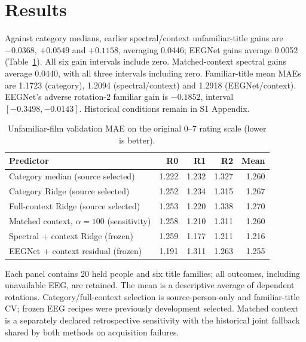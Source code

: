 \documentclass[10pt,letterpaper]{article}
\begin{document}
\section{Results}


Against category medians, earlier spectral/context unfamiliar-title gains are \(-0.0368\), \(+0.0549\) and \(+0.1158\), averaging 0.0446; EEGNet gains average 0.0052 (Table~\ref{tab:primary}). All six gain intervals include zero. Matched-context spectral gains average 0.0440, with all three intervals including zero. Familiar-title mean MAEs are 1.1723 (category), 1.2094 (spectral/context) and 1.2918 (EEGNet/context). EEGNet's adverse rotation-2 familiar gain is \(-0.1852\), interval \([-0.3498,-0.0143]\). Historical conditions remain in S1 Appendix.

\begin{table}[!htbp]
\centering
\small
\caption{Unfamiliar-film validation MAE on the original 0--7 rating scale (lower is better).}
\label{tab:primary}
\begin{tabular}{lrrrr}
\toprule
Predictor & R0 & R1 & R2 & Mean \\
\midrule
Category median (source selected) & 1.222 & 1.232 & 1.327 & 1.260 \\
Category Ridge (source selected) & 1.252 & 1.234 & 1.315 & 1.267 \\
Full-context Ridge (source selected) & 1.253 & 1.220 & 1.338 & 1.270 \\
Matched context, $\alpha=100$ (sensitivity) & 1.258 & 1.210 & 1.311 & 1.260 \\
Spectral + context Ridge (frozen) & 1.259 & 1.177 & 1.211 & 1.216 \\
EEGNet + context residual (frozen) & 1.191 & 1.311 & 1.263 & 1.255 \\
\bottomrule
\end{tabular}
\par\medskip\begin{minipage}{0.97\linewidth}\footnotesize Each panel contains 20 held people and six title families; all outcomes, including unavailable EEG, are retained. The mean is a descriptive average of dependent rotations. Category/full-context selection is source-person-only and familiar-title CV; frozen EEG recipes were previously development selected. Matched context is a separately declared retrospective sensitivity with the historical joint fallback shared by both methods on acquisition failures.\end{minipage}
\end{table}
\end{document}
